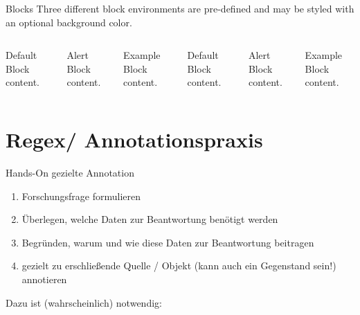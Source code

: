 \begin{frame}{Blocks}
  Three different block environments are pre-defined and may be styled with an
  optional background color.

  \begin{columns}[T,onlytextwidth]
      \begin{block}{Default}
        Block content.
      \end{block}

      \begin{alertblock}{Alert}
        Block content.
      \end{alertblock}

      \begin{exampleblock}{Example}
        Block content.
      \end{exampleblock}



      \begin{block}{Default}
        Block content.
      \end{block}

      \begin{alertblock}{Alert}
        Block content.
      \end{alertblock}

      \begin{exampleblock}{Example}
        Block content.
      \end{exampleblock}

  \end{columns}
\end{frame}




\section{Regex/ Annotationspraxis}
\begin{frame}[allowframebreaks]{Hands-On gezielte Annotation}
\\ 
\smallskip 

 \footnotesize
\begin{enumerate}
    \item Forschungsfrage formulieren
    \item Überlegen, welche Daten zur Beantwortung benötigt werden
    \item Begründen, warum und wie diese Daten zur Beantwortung beitragen
    \item gezielt zu erschließende Quelle / Objekt (kann auch ein Gegenstand sein!) annotieren
\end{enumerate}

Dazu ist (wahrscheinlich)  notwendig:\\[0.5em]
\end{frame}

